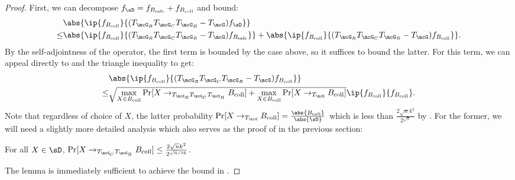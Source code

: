 \begin{proof}
First, we can decompose $f_\sD = f_{B_{\mathrm{safe}}} + f_{B_{\mathrm{coll}}}$ and bound:
\begin{align*}
    &\abs{\ip{f_{B_{\mathrm{coll}}}}{(T_{\mcG_R}T_{\mcG_C}T_{\mcG_R} - T_\mcG) f_\sD}} \\
    \leq &\abs{\ip{f_{B_{\mathrm{coll}}}}{(T_{\mcG_R}T_{\mcG_C}T_{\mcG_R} - T_\mcG) f_{B_{\mathrm{safe}}}}} + \abs{\ip{f_{B_{\mathrm{coll}}}}{(T_{\mcG_R}T_{\mcG_C}T_{\mcG_R} - T_\mcG) f_{B_{\mathrm{coll}}}}}.
\end{align*}
By the self-adjointness of the operator, the first term is bounded by the case above, so it suffices to bound the latter. For this term, we can appeal directly to  and the triangle inequality to get:
\begin{align*}
    &\abs{\ip{f_{B_{\mathrm{coll}}}}{(T_{\mcG_R}T_{\mcG_C}T_{\mcG_R} - T_\mcG) f_{B_{\mathrm{coll}}}}} \\
    \leq &\sqrt{\max_{X \in B_{\mathrm{coll}}} \Pr[X \to_{T_{\mcG_R}T_{\mcG_C}T_{\mcG_R}} B_{\mathrm{coll}}] + \max_{X \in B_{\mathrm{coll}}} \Pr[X \to_{T_\mcG} B_{\mathrm{coll}}]} \ip{f_{B_{\mathrm{coll}}}}{f_{B_{\mathrm{coll}}}}.
\end{align*}
Note that regardless of choice of $X$, the latter probability $\Pr[X \to_{T_\mcG} B_{\mathrm{coll}}] = \frac{\abs{B_{\mathrm{coll}}}}{\abs{\sD}}$ which is less than $\frac{2\sqrt{n}k^2}{2^{\sqrt{n}}}$ by . For the former, we will need a slightly more detailed analysis which also serves as the proof of  in the previous section:

\begin{lemma}
    \label{lem:relowcollprob}
    For all $X \in \sD$, $\Pr[X \to_{T_{\mcG_C}T_{\mcG_R}} B_{\mathrm{coll}}] \leq \frac{2\sqrt{n}k^2}{2^{\sqrt{n}/16}}$.
\end{lemma}

The lemma is immediately sufficient to achieve the bound in .
\end{proof}

